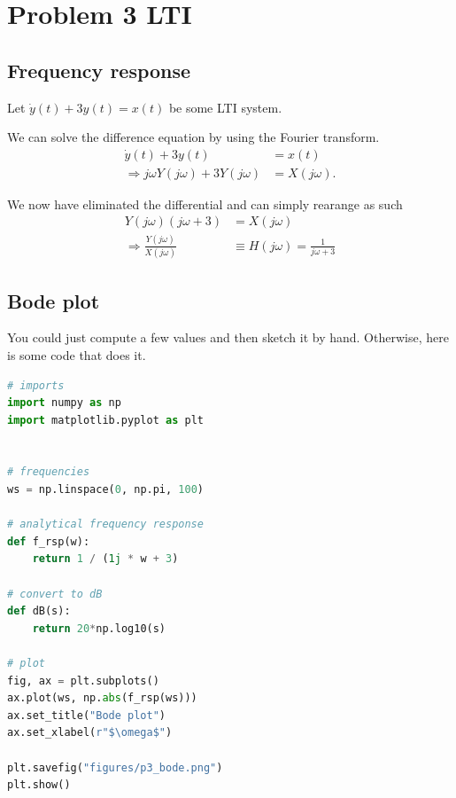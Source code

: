 \section*{Problem 3 LTI}
\subsection*{Frequency response}
Let $\dot{y}(t) + 3y(t) = x(t)$ be some LTI system.

We can solve the difference equation by using the Fourier transform.
\begin{align}
    \dot{y}(t) + 3y(t) &= x(t)\\
\Rightarrow j\omega Y(j\omega) + 3Y(j\omega) &= X(j\omega).
\end{align}

We now have eliminated the differential and can simply rearange as such
\begin{align}
   Y(j\omega)(j\omega  + 3) &= X(j\omega)\\ 
\Rightarrow \frac{Y(j\omega)}{X(j\omega)} &\equiv H(j\omega) = \frac{1}{j\omega + 3}
\end{align}

\subsection*{Bode plot}
You could just compute a few values and then sketch it by hand. Otherwise, here
is some code that does it.

\begin{lstlisting}[language=python]
# imports
import numpy as np
import matplotlib.pyplot as plt


# frequencies
ws = np.linspace(0, np.pi, 100)

# analytical frequency response
def f_rsp(w):
    return 1 / (1j * w + 3)
    
# convert to dB
def dB(s):
    return 20*np.log10(s)

# plot
fig, ax = plt.subplots()
ax.plot(ws, np.abs(f_rsp(ws)))
ax.set_title("Bode plot")
ax.set_xlabel(r"$\omega$")

plt.savefig("figures/p3_bode.png")
plt.show()
\end{lstlisting}

